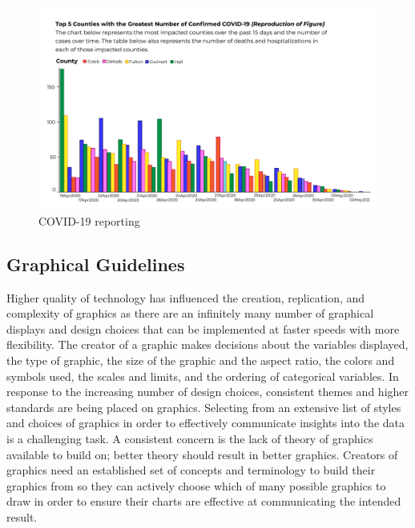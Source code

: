 \documentclass[print]{nuthesis}
\begin{document}
\begin{figure}[tbp]

{\centering \includegraphics[width=0.85\linewidth,]{images/covid-ga-recreation} 

}

\caption{COVID-19 reporting}\label{fig:covid-19-reporting}
\end{figure}


\hypertarget{graphical-guidelines}{%
\subsection{Graphical Guidelines}\label{graphical-guidelines}}

Higher quality of technology has influenced the creation, replication, and complexity of graphics as there are an infinitely many number of graphical displays and design choices that can be implemented at faster speeds with more flexibility.
The creator of a graphic makes decisions about the variables displayed, the type of graphic, the size of the graphic and the aspect ratio, the colors and symbols used, the scales and limits, and the ordering of categorical variables.
In response to the increasing number of design choices, consistent themes and higher standards are being placed on graphics.
Selecting from an extensive list of styles and choices of graphics in order to effectively communicate insights into the data is a challenging task.
A consistent concern is the lack of theory of graphics available to build on; better theory should result in better graphics.
Creators of graphics need an established set of concepts and terminology to build their graphics from so they can actively choose which of many possible graphics to draw in order to ensure their charts are effective at communicating the intended result.
\end{document}
